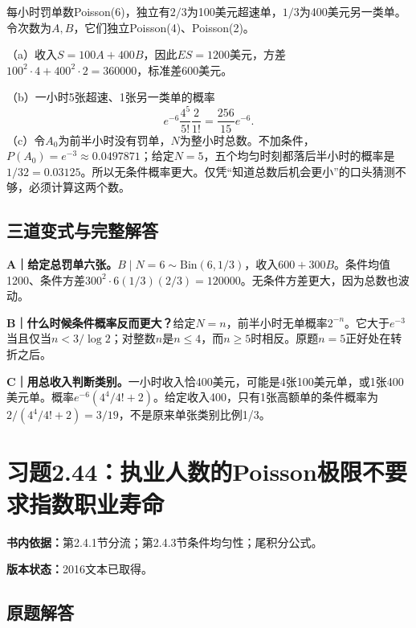 \documentclass[
  11pt,
  a4paper,
  UTF8,fontset=fandol]{ctexart}
\let\OldSection\section
\renewcommand{\section}{\Needspace{7\baselineskip}\OldSection}
\let\OldSubsection\subsection
\renewcommand{\subsection}{\Needspace{5\baselineskip}\OldSubsection}
\begin{document}
每小时罚单数Poisson(6)，独立有\(2/3\)为100美元超速单，\(1/3\)为400美元另一类单。令次数为\(A,B\)，它们独立Poisson(4)、Poisson(2)。

（a）收入\(S=100A+400B\)，因此\(\boxed{ES=1200\text{美元}}\)，方差\(100^2\cdot4+400^2\cdot2=360000\)，标准差\(\boxed{600\text{美元}}\)。

（b）一小时5张超速、1张另一类单的概率
\[\boxed{e^{-6}\frac{4^5}{5!}\frac{2}{1!}=\frac{256}{15}e^{-6}.}\]
（c）令\(A_0\)为前半小时没有罚单，\(N\)为整小时总数。不加条件，\(P(A_0)=e^{-3}\approx0.0497871\)；给定\(N=5\)，五个均匀时刻都落后半小时的概率是\(\boxed{1/32=0.03125}\)。所以无条件概率更大。仅凭``知道总数后机会更小''的口头猜测不够，必须计算这两个数。

\subsection{三道变式与完整解答}\label{ux4e09ux9053ux53d8ux5f0fux4e0eux5b8cux6574ux89e3ux7b54-42}

\textbf{A｜给定总罚单六张。}\(B\mid N=6\sim\mathrm{Bin}(6,1/3)\)，收入\(600+300B\)。条件均值1200、条件方差\(300^2\cdot6(1/3)(2/3)=120000\)。无条件方差更大，因为总数也波动。

\textbf{B｜什么时候条件概率反而更大？}给定\(N=n\)，前半小时无单概率\(2^{-n}\)。它大于\(e^{-3}\)当且仅当\(n<3/\log2\)；对整数\(n\)是\(n\le4\)，而\(n\ge5\)时相反。原题\(n=5\)正好处在转折之后。

\textbf{C｜用总收入判断类别。}一小时收入恰400美元，可能是4张100美元单，或1张400美元单。概率\(e^{-6}(4^4/4!+2)\)。给定收入400，只有1张高额单的条件概率为\(2/(4^4/4!+2)=3/19\)，不是原来单张类别比例1/3。

\newpage

\section{习题2.44：执业人数的Poisson极限不要求指数职业寿命}\label{ux4e60ux98982.44ux6267ux4e1aux4ebaux6570ux7684poissonux6781ux9650ux4e0dux8981ux6c42ux6307ux6570ux804cux4e1aux5bffux547d}

\textbf{书内依据：}第2.4.1节分流；第2.4.3节条件均匀性；尾积分公式。

\textbf{版本状态：}2016文本已取得。

\subsection{原题解答}\label{ux539fux9898ux89e3ux7b54-43}
\end{document}
